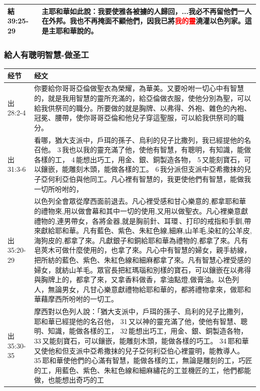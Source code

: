 \begin{table}[H]
\begin{tabular}{p{5em}p{45em}}
結39:25-29&主耶和華如此說：我要使雅各被擄的人歸回，...我必不再留他們一人在外邦。我也不再掩面不顧他們，因我已將\textcolor{red}{我的靈}澆灌以色列家。這是主耶和華說的。\\  \midrule

\end{tabular}
\end{table}

\subsubsection{給人有聰明智慧-做圣工}
\begin{table}[H]
\centering
\begin{tabular}{p{5em}p{45em}}  \toprule
经节&经文 \\  \midrule

出28:2-4&你要給你哥哥亞倫做聖衣為榮耀，為華美。又要吩咐一切心中有智慧的，就是我用智慧的靈所充滿的，給亞倫做衣服，使他分別為聖，可以給我供祭司的職分。所要做的就是胸牌、以弗得、外袍、雜色的內袍、冠冕、腰帶，使你哥哥亞倫和他兒子穿這聖服，可以給我供祭司的職分。\\  \midrule
出31:3-6&看哪，猶大支派中，戶珥的孫子、烏利的兒子比撒列，我已經提他的名召他。 3 我也以我的靈充滿了他，使他有智慧，有聰明，有知識，能做各樣的工， 4 能想出巧工，用金、銀、銅製造各物， 5 又能刻寶石，可以鑲嵌，能雕刻木頭，能做各樣的工。 6 我分派但支派中亞希撒抹的兒子亞何利亞伯與他同工。凡心裡有智慧的，我更使他們有智慧，能做我一切所吩咐的，\\  \midrule
出35:20-29&以色列全會眾從摩西面前退去。凡心裡受感和甘心樂意的,都拿耶和華的禮物來,用以做會幕和其中一切的使用,又用以做聖衣。凡心裡樂意獻禮物的,連男帶女，各將金器,就是胸前針、耳環 、打印的戒指和手釧,帶來獻給耶和華。凡有藍色、紫色、朱紅色線,細麻,山羊毛,染紅的公羊皮,海狗皮的,都拿了來。凡獻銀子和銅給耶和華為禮物的,都拿了來。凡有皂莢木可做什麼使用的，也拿了來。凡心中有智慧的婦女，親手紡線，把所紡的藍色、紫色、朱紅色線和細麻都拿了來。凡有智慧心裡受感的婦女，就紡山羊毛。眾官長把紅瑪瑙和別樣的寶石，可以鑲嵌在以弗得與胸牌上的，都拿了來，又拿香料做香，拿油點燈,做膏油。以色列人，無論男女，凡甘心樂意獻禮物給耶和華的，都將禮物拿來，做耶和華藉摩西所吩咐的一切工。\\  \midrule

出35:30-35&摩西對以色列人說：「猶大支派中，戶珥的孫子、烏利的兒子比撒列，耶和華已經提他的名召他， 31 又以神的靈充滿了他，使他有智慧、聰明、知識，能做各樣的工， 32 能想出巧工，用金、銀、銅製造各物， 33 又能刻寶石，可以鑲嵌，能雕刻木頭，能做各樣的巧工。 34 耶和華又使他和但支派中亞希撒抹的兒子亞何利亞伯心裡靈明，能教導人。 35 耶和華使他們的心滿有智慧，能做各樣的工，無論是雕刻的工，巧匠的工，用藍色、紫色、朱紅色線和細麻繡花的工並機匠的工，他們都能做，也能想出奇巧的工\\  \midrule

\end{tabular}
\end{table}



